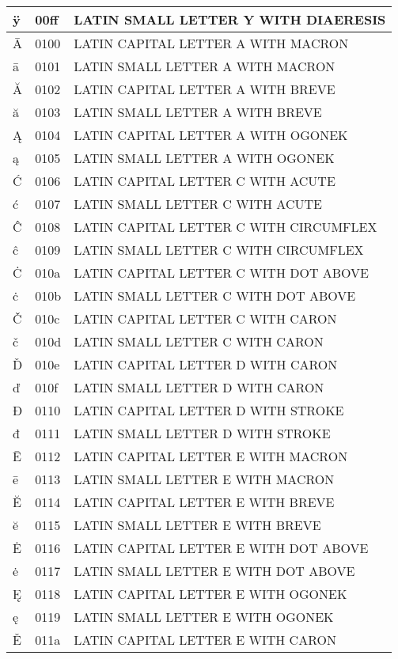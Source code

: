 \documentclass[12pt,letterpaper,openany]{book}
\begin{document}
\begin{center}
\begin{supertabular}{|m{0.25in}|m{0.5in}|m{4in}|}
ÿ & 00ff & LATIN SMALL LETTER Y WITH DIAERESIS\\\hline
Ā & 0100 & LATIN CAPITAL LETTER A WITH MACRON\\\hline
ā & 0101 & LATIN SMALL LETTER A WITH MACRON\\\hline
Ă & 0102 & LATIN CAPITAL LETTER A WITH BREVE\\\hline
ă & 0103 & LATIN SMALL LETTER A WITH BREVE\\\hline
Ą & 0104 & LATIN CAPITAL LETTER A WITH OGONEK\\\hline
ą & 0105 & LATIN SMALL LETTER A WITH OGONEK\\\hline
Ć & 0106 & LATIN CAPITAL LETTER C WITH ACUTE\\\hline
ć & 0107 & LATIN SMALL LETTER C WITH ACUTE\\\hline
Ĉ & 0108 & LATIN CAPITAL LETTER C WITH CIRCUMFLEX\\\hline
ĉ & 0109 & LATIN SMALL LETTER C WITH CIRCUMFLEX\\\hline
Ċ & 010a & LATIN CAPITAL LETTER C WITH DOT ABOVE\\\hline
ċ & 010b & LATIN SMALL LETTER C WITH DOT ABOVE\\\hline
Č & 010c & LATIN CAPITAL LETTER C WITH CARON\\\hline
č & 010d & LATIN SMALL LETTER C WITH CARON\\\hline
Ď & 010e & LATIN CAPITAL LETTER D WITH CARON\\\hline
ď & 010f & LATIN SMALL LETTER D WITH CARON\\\hline
Đ & 0110 & LATIN CAPITAL LETTER D WITH STROKE\\\hline
đ & 0111 & LATIN SMALL LETTER D WITH STROKE\\\hline
Ē & 0112 & LATIN CAPITAL LETTER E WITH MACRON\\\hline
ē & 0113 & LATIN SMALL LETTER E WITH MACRON\\\hline
Ĕ & 0114 & LATIN CAPITAL LETTER E WITH BREVE\\\hline
ĕ & 0115 & LATIN SMALL LETTER E WITH BREVE\\\hline
Ė & 0116 & LATIN CAPITAL LETTER E WITH DOT ABOVE\\\hline
ė & 0117 & LATIN SMALL LETTER E WITH DOT ABOVE\\\hline
Ę & 0118 & LATIN CAPITAL LETTER E WITH OGONEK\\\hline
ę & 0119 & LATIN SMALL LETTER E WITH OGONEK\\\hline
Ě & 011a & LATIN CAPITAL LETTER E WITH CARON\\\hline

\end{supertabular}
\end{center}
\end{document}
